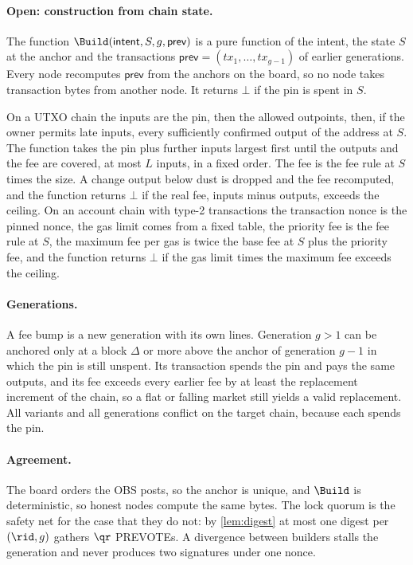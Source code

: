 \paragraph{Open: construction from chain state.} The function $\Build(\textsf{intent}, S, g, \textsf{prev})$ is a pure function of the intent, the state $S$ at the anchor and the transactions $\textsf{prev} = (tx_1, \dots, tx_{g-1})$ of earlier generations. Every node recomputes $\textsf{prev}$ from the anchors on the board, so no node takes transaction bytes from another node. It returns $\bot$ if the pin is spent in $S$.

On a UTXO chain the inputs are the pin, then the allowed outpoints, then, if the owner permits late inputs, every sufficiently confirmed output of the address at $S$. The function takes the pin plus further inputs largest first until the outputs and the fee are covered, at most $L$ inputs, in a fixed order. The fee is the fee rule at $S$ times the size. A change output below dust is dropped and the fee recomputed, and the function returns $\bot$ if the real fee, inputs minus outputs, exceeds the ceiling. On an account chain with type-2 transactions the transaction nonce is the pinned nonce, the gas limit comes from a fixed table, the priority fee is the fee rule at $S$, the maximum fee per gas is twice the base fee at $S$ plus the priority fee, and the function returns $\bot$ if the gas limit times the maximum fee exceeds the ceiling.

\paragraph{Generations.} A fee bump is a new generation with its own lines. Generation $g > 1$ can be anchored only at a block $\Delta$ or more above the anchor of generation $g-1$ in which the pin is still unspent. Its transaction spends the pin and pays the same outputs, and its fee exceeds every earlier fee by at least the replacement increment of the chain, so a flat or falling market still yields a valid replacement. All variants and all generations conflict on the target chain, because each spends the pin.

\paragraph{Agreement.} The board orders the OBS posts, so the anchor is unique, and $\Build$ is deterministic, so honest nodes compute the same bytes. The lock quorum is the safety net for the case that they do not: by \cref{lem:digest} at most one digest per $(\rid, g)$ gathers $\qr$ PREVOTEs. A divergence between builders stalls the generation and never produces two signatures under one nonce.

